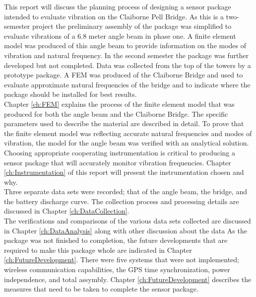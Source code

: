 
\indent This report will discuss the planning process of designing a sensor package intended to evaluate vibration on the Claiborne Pell Bridge. As this is a
two-semester project the preliminary assembly of the package was simplified to evaluate vibrations of a 6.8 meter angle beam in phase one. A finite element
model was produced of this angle beam to provide information on the modes of vibration and natural frequency. In the second semester the package was
further developed but not completed. Data was collected from the top of the towers by a prototype package. A FEM was produced of the Claiborne Bridge
and used to evaluate approximate natural frequencies of the bridge and to indicate where the package should be installed for best results. \\

\indent Chapter \ref{ch:FEM} explains the process of the finite element model that was produced for both the angle beam and the Claiborne Bridge. The specific
parameters  used to describe the material are described in detail. To prove that the finite element model was reflecting accurate natural frequencies and
modes of vibration, the model for the angle beam was verified with an analytical solution. \\
\indent Choosing appropriate cooperating instrumentation is critical to producing a sensor package that will accurately monitor vibration frequencies.
Chapter \ref{ch:Instrumentation} of this report will present the instrumentation chosen and why. \\
\indent Three separate data sets were recorded; that of the angle beam, the bridge, and the battery discharge curve. The collection process and processing
details are discussed in Chapter \ref{ch:DataCollection}. \\ 
\indent The verifications and comparisons of the various data sets collected are discussed in Chapter \ref{ch:DataAnalysis} along with other discussion about the data
\indent As the package was not finished to completion, the future developments that are required to make this package whole are indicated in Chapter \ref{ch:FutureDevelopment}.
There were five systems that were not implemented; wireless communication capabilities, the GPS time synchronization, power independence, and total assymbly. Chapter \ref{ch:FutureDevelopment} describes the measures that need to be taken to complete the sensor package.\\

